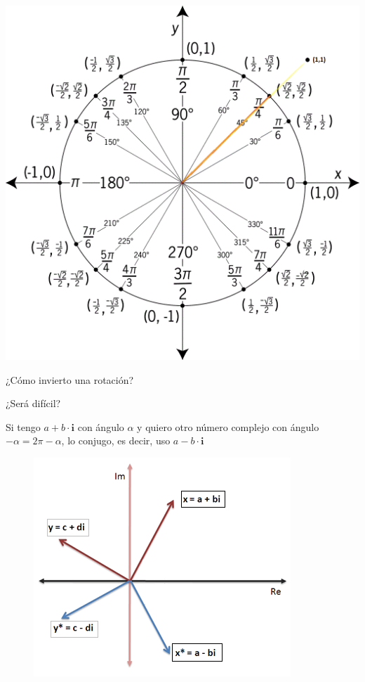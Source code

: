 \documentclass[10pt]{beamer}
\begin{document}
\begin{frame}

\includegraphics[scale=0.35]{unit_circle.png}

\end{frame}

\begin{frame}{¿Cómo invierto una rotación?}

¿Será difícil? \pause

Si tengo $a+b\cdot \textbf{i}$ con ángulo $\alpha$ y quiero otro número complejo con ángulo $-\alpha = 2\pi - \alpha$, lo conjugo, es decir, uso $a-b\cdot\textbf{i}$

\begin{figure}
\centering
\includegraphics[scale=0.7]{conjugado.png}
\end{figure}


\end{frame}
\end{document}

